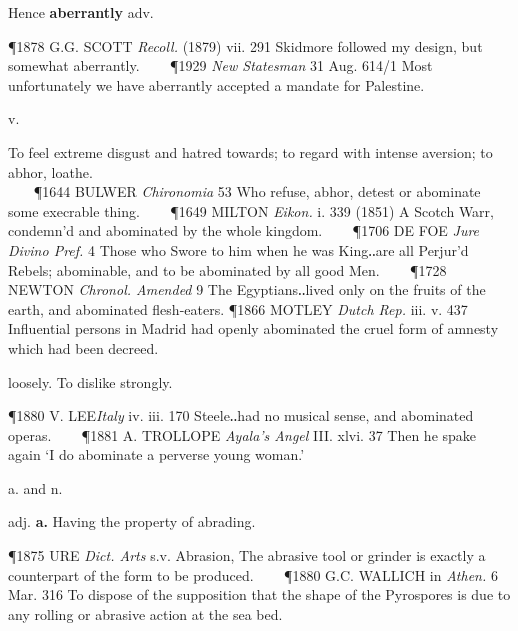 \begin{description}[wide, labelwidth=!, labelindent=0pt]
\begin{myenumerate}
\noindent Hence \textbf{aberrantly} adv. 

\P 1878 G.G. SCOTT \textit{Recoll.} (1879) vii. 291 Skidmore followed my design, but
somewhat aberrantly.    
\P 1929 \textit{New Statesman} 31 Aug. 614/1 Most unfortunately we
have aberrantly accepted a mandate for Palestine.
\end{myenumerate}


 v. 

\noindent {}

\vspace{-0.3cm}

\begin{myenumerate}
 To feel extreme disgust and hatred towards; to regard with intense aversion;
to abhor, loathe.  \\
   
\P 1644 BULWER \textit{Chironomia} 53 Who refuse, abhor, detest or abominate some
execrable thing.    
\P 1649 MILTON \textit{Eikon.} i. 339 (1851) A Scotch Warr, condemn'd
and abominated by the whole kingdom.    
\P 1706 DE FOE \textit{Jure Divino Pref.} 4 Those
who Swore to him when he was King‥are all Perjur'd Rebels; abominable, and to be
abominated by all good Men.    
\P 1728 NEWTON \textit{Chronol. Amended} 9 The
Egyptians‥lived only on the fruits of the earth, and abominated flesh-eaters.
\P 1866 MOTLEY \textit{Dutch Rep.} iii. v. 437 Influential persons in Madrid had openly
abominated the cruel form of amnesty which had been decreed.

 loosely. To dislike strongly. 

\P 1880 V. LEE\textit{Italy} iv. iii. 170 Steele‥had no musical sense, and abominated
operas.    
\P 1881 A. TROLLOPE \textit{Ayala's Angel} III. xlvi. 37 Then he spake again ‘I
do abominate a perverse young woman.’
\end{myenumerate}

 a. and n.

\noindent {}

\vspace{-0.3cm}

\begin{myenumerate}
 adj. \textbf{a.} Having the property of abrading.  

\P 1875 URE \textit{Dict. Arts} s.v. Abrasion, The abrasive tool or grinder is exactly a
counterpart of the form to be produced.    
\P 1880 G.C. WALLICH in \textit{Athen.} 6 Mar. 316 To dispose of the supposition that 
the shape of the Pyrospores is due to any rolling or abrasive action at the sea bed.


\end{myenumerate}
\end{description}
